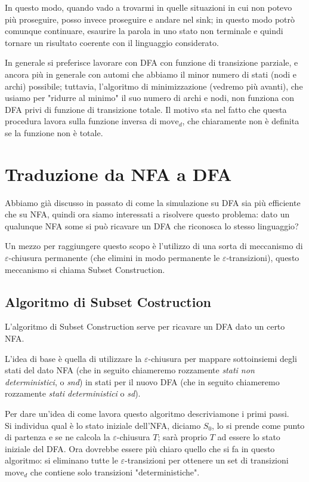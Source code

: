 \documentclass[class=book, crop=false, oneside, 12pt]{standalone}
\begin{document}
In questo modo, quando vado a trovarmi in quelle situazioni in cui non potevo più proseguire, posso invece proseguire e andare nel sink; in questo modo potrò comunque continuare, esaurire la parola in uno stato non terminale e quindi tornare un risultato coerente con il linguaggio considerato.

In generale si preferisce lavorare con DFA con funzione di transizione parziale, e ancora più in generale con automi che abbiamo il minor numero di stati (nodi e archi) possibile; tuttavia, l'algoritmo di minimizzazione (vedremo più avanti), che usiamo per "ridurre al minimo" il suo numero di archi e nodi, non funziona con DFA privi di funzione di transizione totale. Il motivo sta nel fatto che questa procedura lavora sulla funzione inversa di \(\textrm{move}_d\), che chiaramente non è definita se la funzione non è totale.


\section{Traduzione da NFA a DFA}
Abbiamo già discusso in passato di come la simulazione su DFA sia più efficiente che su NFA, quindi ora siamo interessati a risolvere questo problema: dato un qualunque NFA some si può ricavare un DFA che riconosca lo stesso linguaggio?

Un mezzo per raggiungere questo scopo è l’utilizzo di una sorta di meccanismo di \(\varepsilon\)-chiusura permanente (che elimini in modo permanente le \(\varepsilon\)-transizioni), questo meccanismo si chiama Subset Construction.


\subsection{Algoritmo di Subset Costruction}
L’algoritmo di Subset Construction serve per ricavare un DFA dato un certo NFA.

L'idea di base è quella di utilizzare la \(\varepsilon\)-chiusura per mappare sottoinsiemi degli stati del dato NFA (che in seguito chiameremo rozzamente \emph{stati non deterministici}, o \emph{snd}) in stati per il nuovo DFA (che in seguito chiameremo rozzamente \emph{stati deterministici} o \emph{sd}).

Per dare un'idea di come lavora questo algoritmo descriviamone i primi passi.\\
Si individua qual è lo stato iniziale dell'NFA, diciamo \(S_0\), lo si prende come punto di partenza e se ne calcola la \(\varepsilon\)-chiusura \(T\); sarà proprio \(T\) ad essere lo stato iniziale del DFA. Ora dovrebbe essere più chiaro quello che si fa in questo algoritmo: si eliminano tutte le \(\varepsilon\)-transizioni per ottenere un set di transizioni \(\textrm{move}_d\) che contiene solo transizioni "deterministiche".
\end{document}
